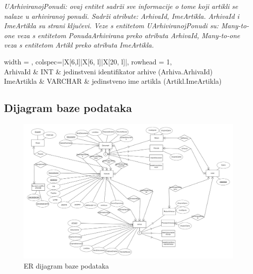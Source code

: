 				\textit{UArhiviranojPonudi: ovaj entitet sadrži sve informacije o tome koji artikli se nalaze u arhiviranoj ponudi. Sadrži atribute: ArhivaId, ImeArtikla. ArhivaId i ImeArtikla su strani ključevi.
				Veze s entitetom UArhiviranojPonudi su: Many-to-one veza s entitetom PonudaArhivirana preko atributa ArhivaId,
				Many-to-one veza s entitetom Artikl preko atributa ImeArtikla.}
				
				
				\begin{longtblr}[
					label=none,
					entry=none
					]{
						width = \textwidth,
						colspec={|X[6,l]|X[6, l]|X[20, l]|}, 
						rowhead = 1,
					} %
					\hline {}	 \\ \hline[3pt]
					ArhivaId & INT	&  	jedinstveni identifikator arhive (Arhiva.ArhivaId)  	\\ \hline
					ImeArtikla & VARCHAR	&  	jedinstveno ime artikla (Artikl.ImeArtikla)  	\\ \hline
				\end{longtblr}
				
				
			
			\subsection{Dijagram baze podataka}

			\begin{figure}[H]
				\includegraphics[width=\textwidth]{slike/ER_dijagram.png} %
				\caption{ER dijagram baze podataka}
				\label{fig:er_diagram} %
			\end{figure}

